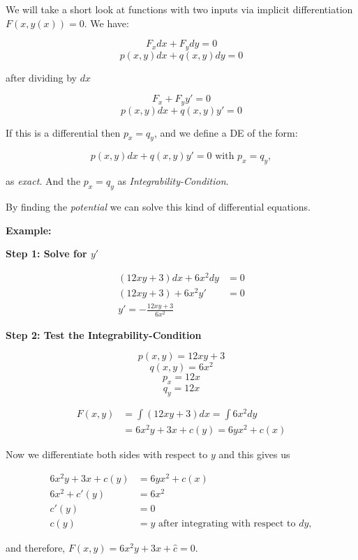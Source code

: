 We will take a short look at functions with two inputs via implicit differentiation \(F(x,y(x)) = 0\).
We have:

\[
    F_x dx + F_y dy = 0
\]
\[
    p(x,y)dx + q(x,y)dy = 0
\]

after dividing by \(dx\)

\[
    F_x + F_y y' = 0
\]
\[
    p(x,y)dx + q(x,y)y' = 0
\]

If this is a differential then \(p_x = q_y\), and we define a DE of the form:

\[
    p(x,y)dx + q(x,y)y' = 0 \text{ with } p_x = q_y,
\]

as \emph{exact}. And the \(p_x = q_y\) as \emph{Integrability-Condition}.
\vspace{\baselineskip}

By finding the \emph{potential} we can solve this kind of differential equations.
\vspace{\baselineskip}

\textbf{Example:}
\vspace{\baselineskip}

\textbf{Step 1: Solve for \(y'\)}

\begin{align*}
    (12xy + 3)dx + 6x^2dy &= 0\\
    (12xy + 3) + 6x^2 y' &= 0\\
    y' = - \frac{12xy + 3}{6x^2}
\end{align*}

\textbf{Step 2: Test the Integrability-Condition}

\[
    p(x,y) = 12xy + 3
\]
\[
    q(x,y) = 6x^2
\] 
\[
    p_x = 12x
\]
\[
    q_y = 12x
\]

\begin{align*}
    F(x,y) &= \int (12xy + 3)dx = \int 6x^2 dy\\
        &= 6x^2 y + 3x + c(y) = 6yx^2 + c(x)
\end{align*}

Now we differentiate both sides with respect to \(y\) and this gives us

\begin{align*}
    6x^2y + 3x + c(y) &= 6yx^2 + c(x) \\
    6x^2 + c'(y) &= 6x^2 \\
           c'(y) &= 0 \\
            c(y) &= y \text{ after integrating with respect to } dy,
\end{align*}

and therefore, \(F(x,y) = 6x^2y + 3x + \hat{c} = 0\).
\vspace{\baselineskip}

